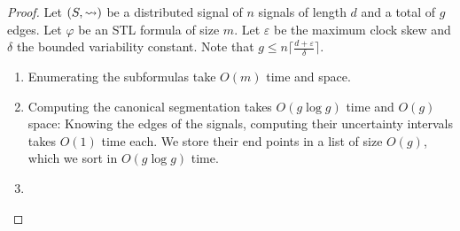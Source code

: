 \begin{proof}
	Let $(S, {\rightsquigarrow})$ be a distributed signal of $n$ signals of length $d$ and a total of $g$ edges.
	Let $\varphi$ be an STL formula of size $m$.
	Let $\varepsilon$ be the maximum clock skew and $\delta$ the bounded variability constant.
	Note that $g \leq n  \lceil \frac{d + \varepsilon}{\delta} \rceil$.
		
	\begin{enumerate}
		\item 
		Enumerating the subformulas take $O(m)$ time and space.
		
		\item 

		Computing the canonical segmentation takes $O(g \log g)$ time and $O(g)$ space: %
		Knowing the edges of the signals, computing their uncertainty intervals takes $O(1)$ time each.
		We store their end points in a list of size $O(g)$, which we sort in $O(g \log g)$ time.
		
		\item
			

\end{enumerate}
\end{proof}
